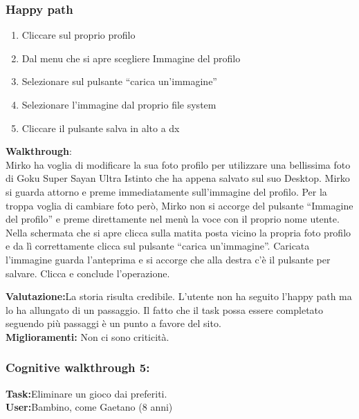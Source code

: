 \documentclass[../Report.tex]{subfiles}
\begin{document}
    \subsubsection{Happy path}
    \begin{enumerate}
        \item Cliccare sul proprio profilo
        \item Dal menu che si apre scegliere Immagine del profilo 
        \item Selezionare sul pulsante  “carica un’immagine”
        \item Selezionare l’immagine dal proprio file system
        \item Cliccare il pulsante salva in alto a dx
        
    \end{enumerate}
    \textbf{Walkthrough}:\\
    Mirko ha voglia di modificare la sua foto profilo per utilizzare una bellissima foto di Goku Super Sayan Ultra Istinto che ha appena salvato sul suo Desktop. Mirko si guarda attorno e preme immediatamente sull’immagine del profilo. Per la troppa voglia di cambiare foto però, Mirko non si accorge del pulsante “Immagine del profilo” e preme direttamente nel menù la voce con il proprio nome utente. Nella schermata che si apre clicca sulla matita posta vicino la propria foto profilo e da lì correttamente clicca sul pulsante  “carica un’immagine”. Caricata l’immagine guarda l’anteprima e si accorge che alla destra c’è il pulsante per salvare. Clicca e conclude l’operazione.

    \textbf{Valutazione:}La storia risulta credibile. L’utente non ha seguito l’happy path ma lo ha allungato di un passaggio. Il fatto che il task possa essere completato seguendo più passaggi è un punto a favore del sito.\\
    \textbf{Miglioramenti:} Non ci sono criticità.

    
    \subsubsection{Cognitive walkthrough 5:}
    \textbf{Task:}Eliminare un gioco dai preferiti.\\
    \textbf{User:}Bambino, come Gaetano (8 anni)
\end{document}
